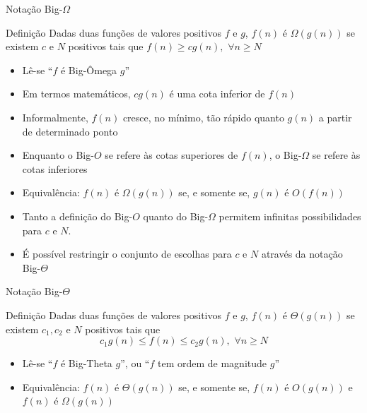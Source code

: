 \begin{frame}[fragile]{Notação Big-$\Omega$}

    \begin{block}{Definição}
		Dadas {duas} funções de valores 
		{positivos} $f$ e $g$, $f(n)$ é $\Omega(g(n))$ se 
		existem $c$ e $N$ {positivos} tais que $f(n) \geq cg(n),\, \, \forall n\geq N$
    \end{block}

	\begin{itemize}
		\item Lê-se ``$f$ é {Big-Ômega} $g$''

		\item Em termos matemáticos, $cg(n)$ é uma cota inferior de $f(n)$

		\item {Informalmente}, $f(n)$ cresce, no mínimo, 
		tão rápido quanto $g(n)$ a partir de determinado ponto

		\item Enquanto o Big-$O$ se refere às cotas superiores de 
		$f(n)$, o Big-$\Omega$ se refere às cotas inferiores

		\item Equivalência: $f(n)$ é $\Omega(g(n))$ se, e 
		somente se, $g(n)$ é $O(f(n))$

		\item Tanto a definição do Big-$O$ quanto do Big-$\Omega$ 
		permitem infinitas possibilidades para $c$ e $N$.

		\item É possível restringir o conjunto de escolhas para 
		$c$ e $N$ através da notação Big-$\Theta$
	\end{itemize}

\end{frame}

\begin{frame}[fragile]{Notação Big-$\Theta$}

    \begin{block}{Definição}
		Dadas {duas} funções de valores 
		{positivos} $f$ e $g$, $f(n)$ é $\Theta(g(n))$ se 
		existem $c_1, c_2$ e $N$ {positivos} tais que
		\[c_1g(n) \leq f(n) \leq c_2g(n),\, \, \forall n\geq N\] 
    \end{block}
		
	\begin{itemize}
		\item Lê-se ``$f$ é Big-Theta $g$'', ou ``$f$ tem ordem de magnitude $g$''

		\item Equivalência: $f(n)$ é $\Theta(g(n))$ se, e somente 
		se, $f(n)$ é $O(g(n))$ e $f(n)$ é $\Omega(g(n))$
	\end{itemize}

\end{frame}

